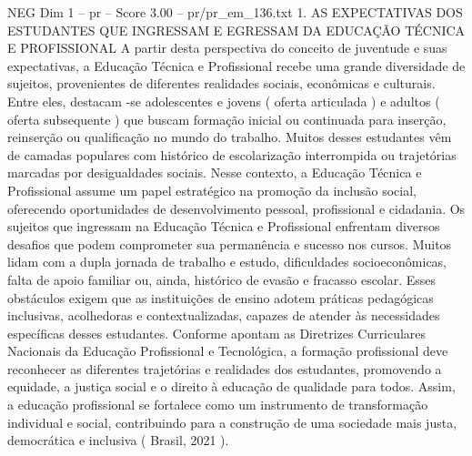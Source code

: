\begin{textsample}{NEG Dim 1 – pr – Score 3.00 – pr/pr\_em\_136.txt}  \label{ex:f1_neg_262}
1.
AS EXPECTATIVAS DOS ESTUDANTES QUE INGRESSAM E EGRESSAM DA EDUCAÇÃO TÉCNICA E PROFISSIONAL A partir desta perspectiva do conceito de juventude e suas expectativas, a Educação Técnica e Profissional recebe uma grande diversidade de sujeitos, provenientes de diferentes realidades sociais, econômicas e culturais.
Entre eles, destacam -se adolescentes e jovens ( oferta articulada ) e adultos ( oferta subsequente ) que buscam formação inicial ou continuada para inserção, reinserção ou qualificação no mundo do trabalho.
Muitos desses estudantes vêm de camadas populares com histórico de escolarização interrompida ou trajetórias marcadas por desigualdades sociais.
Nesse contexto, a Educação Técnica e Profissional assume um papel estratégico na promoção da inclusão social, oferecendo oportunidades de desenvolvimento pessoal, profissional e cidadania.
Os sujeitos que ingressam na Educação Técnica e Profissional enfrentam diversos desafios que podem comprometer sua permanência e sucesso nos cursos.
Muitos lidam com a dupla jornada de trabalho e estudo, dificuldades socioeconômicas, falta de apoio familiar ou, ainda, histórico de evasão e fracasso escolar.
Esses obstáculos exigem que as instituições de ensino adotem práticas pedagógicas inclusivas, acolhedoras e contextualizadas, capazes de atender às necessidades específicas desses estudantes.
Conforme apontam as Diretrizes Curriculares Nacionais da Educação Profissional e Tecnológica, a formação profissional deve reconhecer as diferentes trajetórias e realidades dos estudantes, promovendo a equidade, a justiça social e o direito à educação de qualidade para todos.
Assim, a educação profissional se fortalece como um instrumento de transformação individual e social, contribuindo para a construção de uma sociedade mais justa, democrática e inclusiva ( Brasil, 2021 ).

\end{textsample}
